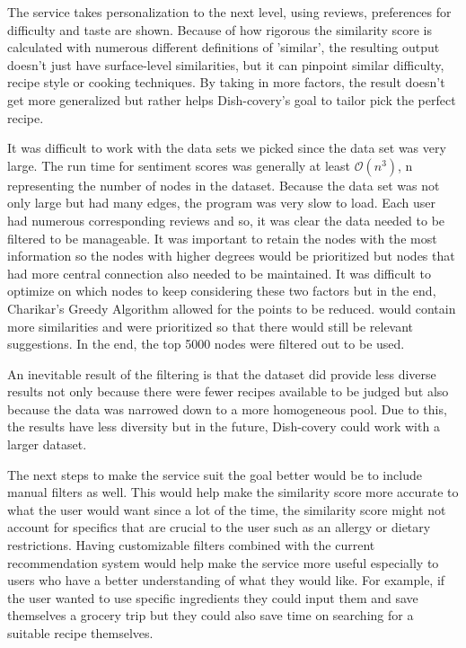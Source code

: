 \documentclass[fontsize=11pt]{article}
\begin{document}
The service takes personalization to the next level, using reviews, preferences for difficulty and taste are shown. Because of how rigorous the similarity score is calculated with numerous different definitions of 'similar', the resulting output doesn't just have surface-level similarities, but it can pinpoint similar difficulty, recipe style or cooking techniques. By taking in more factors, the result doesn't get more generalized but rather helps Dish-covery's goal to tailor pick the perfect recipe. 

It was difficult to work with the data sets we picked since the data set was very large. The run time for sentiment scores was generally at least $\mathcal{O}(n^3)$, n representing the number of nodes in the dataset. Because the data set was not only large but had many edges, the program was very slow to load. Each user had numerous corresponding reviews and so, it was clear the data needed to be filtered to be manageable. It was important to retain the nodes with the most information so the nodes with higher degrees would be prioritized but nodes that had more central connection also needed to be maintained. It was difficult to optimize on which nodes to keep considering these two factors but in the end, Charikar's Greedy Algorithm allowed for the points to be reduced.  would contain more similarities and were prioritized so that there would still be relevant suggestions. In the end, the top 5000 nodes were filtered out to be used. 

An inevitable result of the filtering is that the dataset did provide less diverse results not only because there were fewer recipes available to be judged but also because the data was narrowed down to a more homogeneous pool. Due to this, the results have less diversity but in the future, Dish-covery could work with a larger dataset.

The next steps to make the service suit the goal better would be to include manual filters as well. This would help make the similarity score more accurate to what the user would want since a lot of the time, the similarity score might not account for specifics that are crucial to the user such as an allergy or dietary restrictions. Having customizable filters combined with the current recommendation system would help make the service more useful especially to users who have a better understanding of what they would like. For example, if the user wanted to use specific ingredients they could input them and save themselves a grocery trip but they could also save time on searching for a suitable recipe themselves. 
\end{document}

